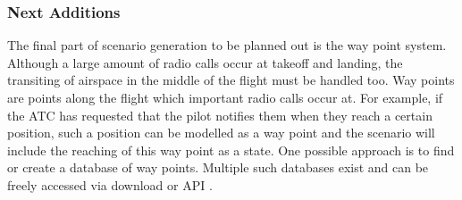 \subsubsection{Next Additions}
The final part of scenario generation to be planned out is the way point system. Although a large amount of radio calls occur at takeoff and landing, the transiting of airspace in the middle of the flight must be handled too. Way points are points along the flight which important radio calls occur at. For example, if the ATC has requested that the pilot notifies them when they reach a certain position, such a position can be modelled as a way point and the scenario will include the reaching of this way point as a state. One possible approach is to find or create a database of way points. Multiple such databases exist and can be freely accessed via download or API \cite{Google-maps-waypoints, Opennav-database}.